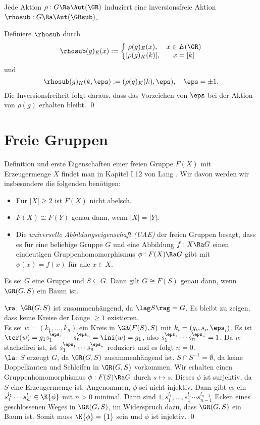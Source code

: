 \BEM Jede Aktion $\rho:G\Ra\Aut(\GR)$ induziert eine inversionsfreie
Aktion $\rhosub:G\Ra\Aut(\GRsub)$.

\bew Definiere $\rhosub$ durch
\[
\rhosub(g)_E(x) :=
\left\{\begin{matrix}
\rho(g)_E(x), & x\in E(\GR) \\
[\rho(g)_K(k)], & x=[k]
\end{matrix}\right.
\]
und
\[
\rhosub(g)_K(k,\eps) :=
(\rho(g)_K(k),\eps),
\quad \eps=\pm 1.
\]
Die Inversionsfreiheit folgt daraus, dass das Vorzeichen von $\eps$
bei der Aktion von $\rho(g)$ erhalten bleibt.
\qed

\section{Freie Gruppen}\label{sec_FG}

Definition und erste Eigenschaften einer freien Gruppe $F(X)$
mit Erzeugermenge $X$ findet man in Kapitel I.12 von Lang \cite{lang}.
Wir davon werden wir insbesondere die folgenden benötigen:
\begin{itemize}
\item Für $|X|\geq 2$ ist $F(X)$ nicht abelsch.
\item $F(X)\cong F(Y)$ genau dann, wenn $|X|=|Y|$.
\item Die \emph{universelle Abbildungseigenschaft (UAE)}
der freien Gruppen besagt, dass es für eine beliebige Gruppe $G$ und
eine Abbildung $f:X\Ra G$ einen eindeutigen Gruppenhomomorphismus
$\phi:F(X)\Ra G$ gibt mit $\phi(x)=f(x)$ für alle $x\in X$.
\end{itemize}

\PROP\label{prop_freibaum}
Es sei $G$ eine Gruppe und $S\subseteq G$. Dann gilt
$G\cong F(S)$ genau dann, wenn $\GR(G,S)$ ein Baum ist.

\bew \glqq$\ra$\grqq:
$\GR(G,S)$ ist zusammenhängend, da $\lag S\rag=G$. Es bleibt zu
zeigen, dass keine Kreise der Länge $\geq 1$ existieren.\\
Es sei $w=(k_1,\ldots,k_n)$ ein Kreis in $\GR(F(S),S)$ mit
$k_i=(g_i,s_i,\eps_i)$.
Es ist $\ter(w)=g_1 s_1^{\eps_1}\cdots s_n^{\eps_n}
=\ini(w)=g_1$, also $s_1^{\eps_1}\cdots s_n^{\eps_n}=1$.
Da $w$ stachelfrei ist, ist $s_1^{\eps_1}\cdots s_n^{\eps_n}$
reduziert und es folgt $n=0$.\\
\glqq$\la$\grqq:
$S$ erzeugt $G$, da $\GR(G,S)$ zusammenhängend ist.
$S\cap S^{-1}=\emptyset$, da keine Doppelkanten und Schleifen
in $\GR(G,S)$ vorkommen. Wir erhalten einen Gruppenhomomorphismus
$\phi:F(S)\Ra G$ durch $s\mapsto s$.
Dieses $\phi$ ist surjektiv, da $S$ eine Erzeugermenge ist.
Angenommen, $\phi$ sei nicht injektiv. Dann gibt es ein
$s_1^{l_1}\cdots s_n^{l_n} \in \K{\phi}$ mit $n>0$ minimal.
Dann sind $1,s_1^{l_1},\ldots,s_1^{l_1}\cdots s_{n-1}^{l_{n-1}}$
Ecken eines geschlossenen Weges in $\GR(G,S)$, im Widerspruch dazu,
dass $\GR(G,S)$ ein Baum ist. Somit muss $\K{\phi}=\{1\}$ sein
und $\phi$ ist injektiv.
\qed

